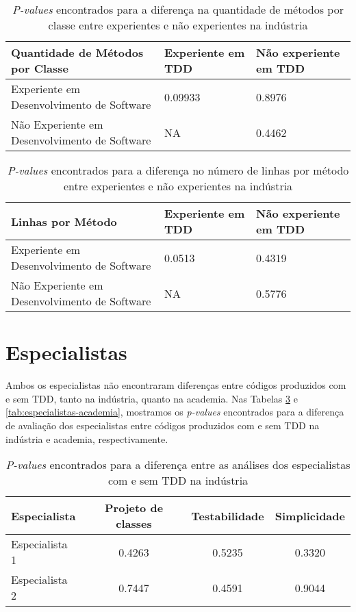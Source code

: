 \documentclass[conference]{IEEEtran}
\begin{document}
\begin{table}[h!]
	\centering
	\begin{tabular}{ | p{3cm} | p{2cm} | p{2cm} | }
		\hline
		 Quantidade de Métodos por Classe & Experiente em TDD & Não experiente em TDD \\
		\hline
			Experiente em Desenvolvimento de Software 		& 0.09933	&	0.8976\\
			\hline
			Não Experiente em Desenvolvimento de Software 	& NA		&	0.4462\\
		\hline
	\end{tabular}
	\caption{\textit{P-values} encontrados para a diferença na quantidade de métodos por classe entre experientes e não experientes na indústria}
	\label{valores-exp-metodos-industria}
\end{table}

\begin{table}[h!]
	\centering
	\begin{tabular}{ | p{3cm} | p{2cm} | p{2cm} | }
		\hline
		 Linhas por Método & Experiente em TDD & Não experiente em TDD \\
		\hline
			Experiente em Desenvolvimento de Software 		& 0.0513	&	0.4319\\
			\hline
			Não Experiente em Desenvolvimento de Software 	& NA		&	0.5776\\
		\hline
	\end{tabular}
	\caption{\textit{P-values} encontrados para a diferença no número de linhas por método entre experientes e não experientes na indústria}
	\label{valores-exp-linhas-industria}
\end{table}

\newpage
\section{Especialistas}

Ambos os especialistas não encontraram diferenças entre códigos produzidos
com e sem TDD, tanto na indústria, quanto na academia. Nas Tabelas 
\ref{tab:especialistas-industria} e \ref{tab:especialistas-academia},
mostramos os \textit{p-values} encontrados para a diferença de avaliação dos especialistas
entre códigos produzidos com e sem TDD na indústria e academia, respectivamente.


\begin{table}[h!]
	\centering
	\begin{tabular}{| p{2cm} | c | c | c | }
		\hline
		Especialista & Projeto de classes & Testabilidade & Simplicidade\\
		\hline
		Especialista 1 &	0.4263 &	0.5235 &	0.3320\\
		Especialista 2 &	0.7447 &	0.4591 &	0.9044\\
		\hline
	\end{tabular}
	\caption{\textit{P-values} encontrados para a diferença entre as análises dos especialistas com e sem TDD na indústria}
	\label{tab:especialistas-industria}
\end{table}
\end{document}
